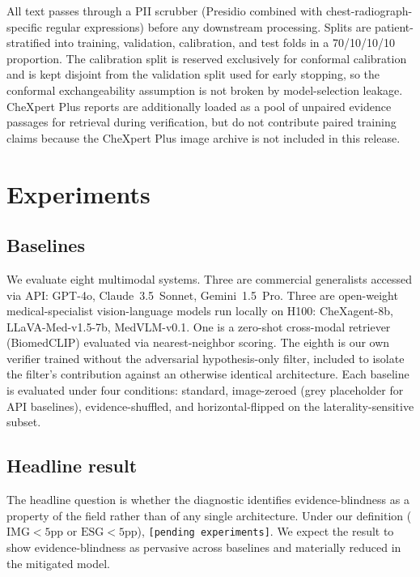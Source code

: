 \documentclass[11pt]{article}
\begin{document}
All text passes through a PII scrubber (Presidio combined with chest-radiograph-specific regular expressions) before any downstream processing. Splits are patient-stratified into training, validation, calibration, and test folds in a 70/10/10/10 proportion. The calibration split is reserved exclusively for conformal calibration and is kept disjoint from the validation split used for early stopping, so the conformal exchangeability assumption is not broken by model-selection leakage. CheXpert Plus reports are additionally loaded as a pool of unpaired evidence passages for retrieval during verification, but do not contribute paired training claims because the CheXpert Plus image archive is not included in this release.

\section{Experiments}

\subsection{Baselines}

We evaluate eight multimodal systems. Three are commercial generalists accessed via API: GPT-4o, Claude~3.5~Sonnet, Gemini~1.5~Pro. Three are open-weight medical-specialist vision-language models run locally on H100: CheXagent-8b, LLaVA-Med-v1.5-7b, MedVLM-v0.1. One is a zero-shot cross-modal retriever (BiomedCLIP) evaluated via nearest-neighbor scoring. The eighth is our own verifier trained without the adversarial hypothesis-only filter, included to isolate the filter's contribution against an otherwise identical architecture. Each baseline is evaluated under four conditions: standard, image-zeroed (grey placeholder for API baselines), evidence-shuffled, and horizontal-flipped on the laterality-sensitive subset.

\subsection{Headline result}

The headline question is whether the diagnostic identifies evidence-blindness as a property of the field rather than of any single architecture. Under our definition ($\text{IMG} < 5\text{pp}$ or $\text{ESG} < 5\text{pp}$), \texttt{[pending experiments]}. We expect the result to show evidence-blindness as pervasive across baselines and materially reduced in the mitigated model.
\end{document}
